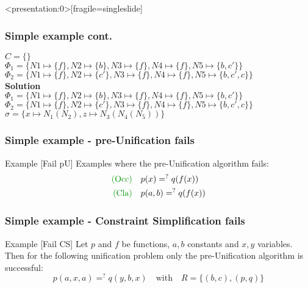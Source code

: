 		\begin{frame}<presentation:0>[fragile=singleslide]
	\frametitle{Simple example cont.}
	\(C=\{\}\)\\
	\(\Phi_1=\{N1\mapsto \{f\}, N2\mapsto \{b\}, N3\mapsto \{f\} , N4\mapsto \{f\},N5\mapsto \{b,c'\}\}\)\\
	\(\Phi_2=\{N1\mapsto \{f\}, N2\mapsto \{c'\}, N3\mapsto \{f\} , N4\mapsto \{f\},N5\mapsto \{b,c',c\}\}\)\\
	
	\vspace{0.5cm}
	\textbf{Solution}\\
	\(\Phi_1=\{N1\mapsto \{f\}, N2\mapsto \{b\}, N3\mapsto \{f\} , N4\mapsto \{f\},N5\mapsto \{b,c'\}\}\)\\
	\(\Phi_2=\{N1\mapsto \{f\}, N2\mapsto \{c'\}, N3\mapsto \{f\} , N4\mapsto \{f\},N5\mapsto \{b,c',c\}\}\)\\
	\(\sigma=\{x \mapsto N_1(N_2), z \mapsto N_3(N_4(N_5))\}\)\\
		\end{frame}
		
	\begin{frame}[fragile=singleslide]
	\frametitle{Simple example - pre-Unification fails}
	\begin{exampleblock}{Example [Fail pU] }
	Examples where the pre-Unification algorithm fails:
		\begin{gather}
		\begin{align}
				\text{\textcolor[rgb]{0,0.58,0}{(Occ)}}\quad & p(x) =^? q(f(x))\\
				\text{\textcolor[rgb]{0,0.58,0}{(Cla)}}\quad & p(a,b) =^? q(f(x))
		\end{align}
		\end{gather}
	\end{exampleblock}
		\vspace{0.5cm}
		\end{frame}
	
	\begin{frame}[fragile=singleslide]
	\frametitle{Simple example - Constraint Simplification fails}		
	\begin{exampleblock}{Example [Fail CS]}
	Let $p$ and $f$ be functions, $a,b$ constants and $x,y$ variables. Then for the following unification problem only the pre-Unification algorithm is successful:
	\[p(a,x,a) =^? q(y,b,x) \quad \text{with} \quad R=\{(b,c),(p,q)\}\]\\
	\end{exampleblock}
	\end{frame}
	
